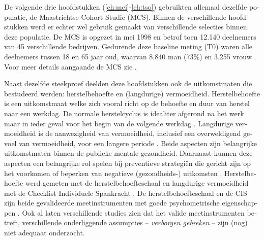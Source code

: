 \begin{otherlanguage}{dutch}
De volgende drie hoofdstukken (\ref{ch:mei}-\ref{ch:tso}) gebruikten allemaal dezelfde populatie, de Maastrichtse Cohort Studie (MCS). Binnen de verschillende hoofdstukken werd er echter wel gebruik gemaakt van verschillende selecties binnen deze populatie. De MCS is opgezet in mei 1998 en betrof toen 12.140 deelnemers van 45 verschillende bedrijven. Gedurende deze baseline meting (T0) waren alle deelnemers tussen 18 en 65 jaar oud, waarvan 8.840 man (73\%) en 3.255 vrouw \parencite{Kant_2003, Mohren_2007}. Voor meer details aangaande de MCS zie \textcite{Mohren_2007}. 

Naast dezelfde steekproef deelden deze hoofdstukken ook de uitkomstmaten die bestudeerd werden: herstelbehoefte en (langdurige) vermoeidheid. Herstelbehoefte is een uitkomstmaat welke zich vooral richt op de behoefte en duur van herstel naar een werkdag. De normale herstelcyclus is idealiter afgerond na het werk maar in ieder geval voor het begin van de volgende werkdag \parencite{Veldhoven_2008}. Langdurige vermoeidheid is de aanwezigheid van vermoeidheid, inclusief een overweldigend gevoel van vermoeidheid, voor een langere periode \parencite{Bultmann_2000,Kalkman_2008}. Beide aspecten zijn belangrijke uitkomstmaten binnen de publieke mentale gezondheid. Daarnaast kunnen deze aspecten een belangrijke rol spelen bij preventieve strategi\"en die gericht zijn op het voorkomen of beperken van negatieve (gezondheids-) uitkomsten \parencite[bijv.,][]{Croon_2003,Amelsvoort_2003,Raeve_2009,Amelsvoort_2002,Silva_2012}. Herstelbehoefte werd gemeten met de herstelbehoefteschaal \parencite{Veldhoven_2003} en langdurige vermoeidheid met de Checklist Individuele Spankracht \parencite{Vercoulen_1994,Beurskens_2000}. De herstelbehoefteschaal en de CIS zijn beide gevalideerde meetinstrumenten met goede psychometrische eigenschappen \parencite[zie bijv.,][]{Veldhoven_2003,Bultmann_2000,Beurskens_2000,Sluiter_2001,Amelsvoort_2003}. Ook al laten verschillende studies zien dat het valide meetinstrumenten betreft, verschillende onderliggende assumpties -- \textit{verborgen gebreken} -- zijn (nog) niet adequaat onderzocht. 


\end{otherlanguage}
